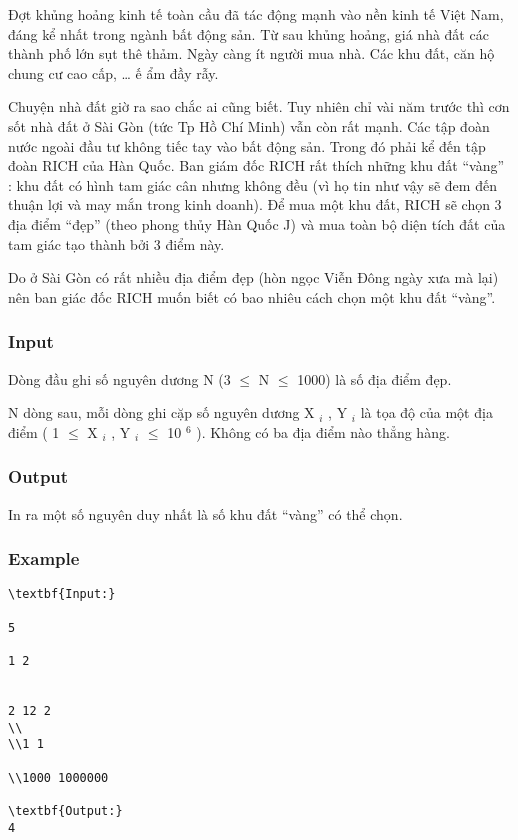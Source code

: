 



   Đợt khủng hoảng kinh tế toàn cầu đã tác động mạnh vào nền kinh tế Việt Nam, đáng kể nhất trong ngành bất động sản. Từ sau khủng hoảng, giá nhà đất các thành phố lớn sụt thê thảm. Ngày càng ít người mua nhà. Các khu đất, căn hộ chung cư cao cấp, … ế ẩm đầy rẫy.  

   Chuyện nhà đất giờ ra sao chắc ai cũng biết. Tuy nhiên chỉ vài năm trước thì cơn sốt nhà đất ở Sài Gòn (tức Tp Hồ Chí Minh) vẫn còn rất mạnh. Các tập đoàn nước ngoài đầu tư không tiếc tay vào bất động sản. Trong đó phải kể đến tập đoàn RICH của Hàn Quốc. Ban giám đốc RICH rất thích những khu đất “vàng” : khu đất có hình tam giác cân nhưng không đều (vì họ tin như vậy sẽ đem đến thuận lợi và may mắn trong kinh doanh). Để mua một khu đất, RICH sẽ chọn 3 địa điểm “đẹp” (theo phong thủy Hàn Quốc J) và mua toàn bộ diện tích đất của tam giác tạo thành bởi 3 điểm này.  

   Do ở Sài Gòn có rất nhiều địa điểm đẹp (hòn ngọc Viễn Đông ngày xưa mà lại) nên ban giác đốc RICH muốn biết có bao nhiêu cách chọn một khu đất “vàng”.  

\subsubsection{   Input  }

   Dòng đầu ghi số nguyên dương N (3  $\le$  N  $\le$  1000) là số địa điểm đẹp.  

   N dòng sau, mỗi dòng ghi cặp số nguyên dương X   $_    i   $   , Y   $_    i   $   là tọa độ của một địa điểm ( 1  $\le$  X   $_    i   $   , Y   $_    i   $    $\le$  10   $^    6   $   ). Không có ba địa điểm nào thẳng hàng.  

\subsubsection{   Output  }

   In ra một số nguyên duy nhất là số khu đất “vàng” có thể chọn.  

\subsubsection{   Example  }
\begin{verbatim}
\textbf{Input:}

5

1 2


2 12 2
\\
\\1 1

\\1000 1000000

\textbf{Output:}
4
\end{verbatim}
